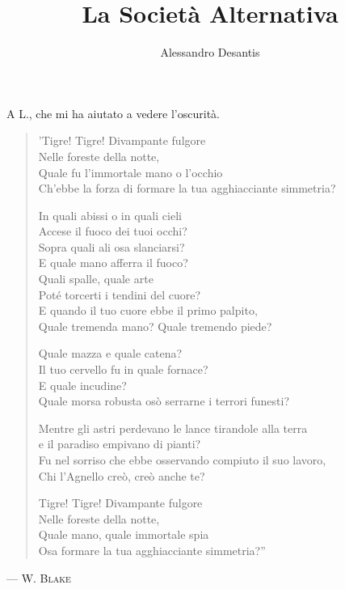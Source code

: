 \documentclass[a4paper,12pt]{book}
\title{La Società Alternativa}
\author{Alessandro Desantis}
\date{}
\begin{document}
\maketitle

\begin{flushright}
A L., che mi ha aiutato a vedere l'oscurità.
\end{flushright}

\clearpage

\begin{verse}
\itshape{
'Tigre! Tigre! Divampante fulgore\\
Nelle foreste della notte,\\
Quale fu l'immortale mano o l'occhio\\
Ch'ebbe la forza di formare la tua agghiacciante simmetria?

In quali abissi o in quali cieli\\
Accese il fuoco dei tuoi occhi?\\
Sopra quali ali osa slanciarsi?\\
E quale mano afferra il fuoco?\\
Quali spalle, quale arte\\
Poté torcerti i tendini del cuore?\\
E quando il tuo cuore ebbe il primo palpito,\\
Quale tremenda mano? Quale tremendo piede?

Quale mazza e quale catena?\\
Il tuo cervello fu in quale fornace?\\
E quale incudine?\\
Quale morsa robusta osò serrarne i terrori funesti?

Mentre gli astri perdevano le lance tirandole alla terra\\
e il paradiso empivano di pianti?\\
Fu nel sorriso che ebbe osservando compiuto il suo lavoro,\\
Chi l'Agnello creò, creò anche te?

Tigre! Tigre! Divampante fulgore\\
Nelle foreste della notte,\\
Quale mano, quale immortale spia\\
Osa formare la tua agghiacciante simmetria?''
\/}
\end{verse}

\begin{flushright}
--- \scshape{W. Blake}
\end{flushright}
\end{document}
